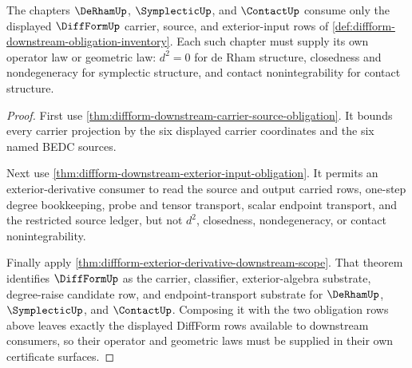 \begin{theorem}
\label{thm:diffform-downstream-consumer-boundary}
The chapters $\DeRhamUp$, $\SymplecticUp$, and $\ContactUp$ consume only the
displayed $\DiffFormUp$ carrier, source, and exterior-input rows of
\autoref{def:diffform-downstream-obligation-inventory}. Each such chapter must
supply its own operator law or geometric law: $d^2=0$ for de Rham structure,
closedness and nondegeneracy for symplectic structure, and contact
nonintegrability for contact structure.
\end{theorem}
\begin{proof}
First use
\autoref{thm:diffform-downstream-carrier-source-obligation}. It bounds every
carrier projection by the six displayed carrier coordinates and the six named
BEDC sources.

Next use \autoref{thm:diffform-downstream-exterior-input-obligation}. It
permits an exterior-derivative consumer to read the source and output carried
rows, one-step degree bookkeeping, probe and tensor transport, scalar endpoint
transport, and the restricted source ledger, but not $d^2$, closedness,
nondegeneracy, or contact nonintegrability.

Finally apply
\autoref{thm:diffform-exterior-derivative-downstream-scope}. That theorem
identifies $\DiffFormUp$ as the carrier, classifier, exterior-algebra
substrate, degree-raise candidate row, and endpoint-transport substrate for
$\DeRhamUp$, $\SymplecticUp$, and $\ContactUp$. Composing it with the two
obligation rows above leaves exactly the displayed DiffForm rows available to
downstream consumers, so their operator and geometric laws must be supplied in
their own certificate surfaces.
\end{proof}
